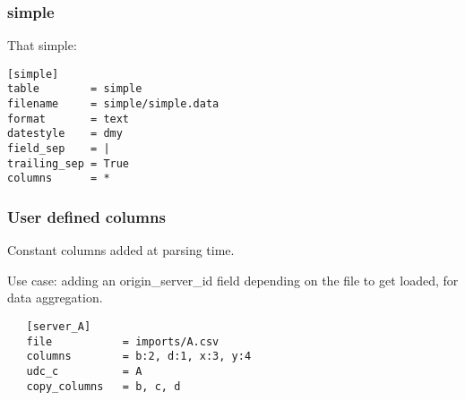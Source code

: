 \documentclass{beamer}
\begin{document}

\begin{frame}[fragile]
  \frametitle{simple}

  That simple:
  \linebreak
  \pause

  \begin{example}
  \begin{verbatim}
[simple]
table        = simple
filename     = simple/simple.data
format       = text
datestyle    = dmy
field_sep    = |
trailing_sep = True
columns      = *
  \end{verbatim}
  \end{example}
\end{frame}

\begin{frame}[fragile]
  \frametitle{User defined columns}

  Constant columns added at parsing time.
  \linebreak
  \pause

  Use case: adding an origin\_server\_id field depending on the file
  to get loaded, for data aggregation.
  \linebreak
  \pause

  \begin{example}
  \begin{verbatim}
   [server_A]
   file           = imports/A.csv
   columns        = b:2, d:1, x:3, y:4
   udc_c          = A
   copy_columns   = b, c, d
  \end{verbatim}
  \end{example}
\end{frame}
\end{document}

